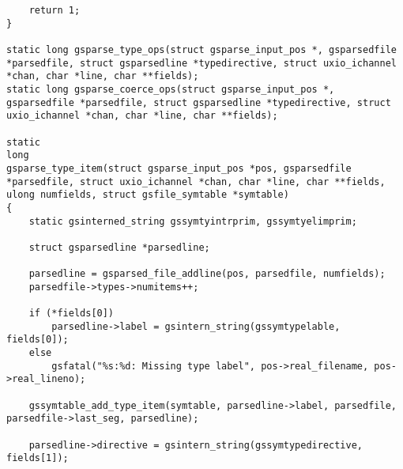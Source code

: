 \documentclass{report}
\begin{document}
\begin{verbatim}
    return 1;
}

static long gsparse_type_ops(struct gsparse_input_pos *, gsparsedfile *parsedfile, struct gsparsedline *typedirective, struct uxio_ichannel *chan, char *line, char **fields);
static long gsparse_coerce_ops(struct gsparse_input_pos *, gsparsedfile *parsedfile, struct gsparsedline *typedirective, struct uxio_ichannel *chan, char *line, char **fields);

static
long
gsparse_type_item(struct gsparse_input_pos *pos, gsparsedfile *parsedfile, struct uxio_ichannel *chan, char *line, char **fields, ulong numfields, struct gsfile_symtable *symtable)
{
    static gsinterned_string gssymtyintrprim, gssymtyelimprim;

    struct gsparsedline *parsedline;

    parsedline = gsparsed_file_addline(pos, parsedfile, numfields);
    parsedfile->types->numitems++;

    if (*fields[0])
        parsedline->label = gsintern_string(gssymtypelable, fields[0]);
    else
        gsfatal("%s:%d: Missing type label", pos->real_filename, pos->real_lineno);

    gssymtable_add_type_item(symtable, parsedline->label, parsedfile, parsedfile->last_seg, parsedline);

    parsedline->directive = gsintern_string(gssymtypedirective, fields[1]);


\end{verbatim}
\end{document}
